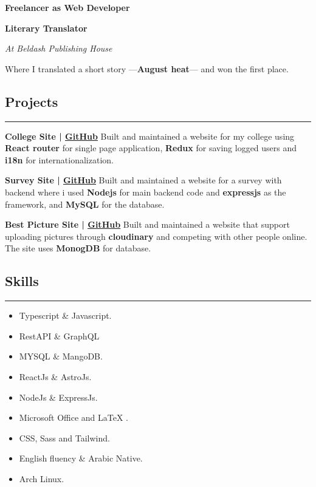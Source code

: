 \documentclass[12pt, a4paper]{article}
\begin{document}
   \textbf{Freelancer as Web Developer}\medbreak

    
   \textbf{Literary Translator}

   \textit{At Beldash Publishing House}\smallbreak

   Where I translated a short story —\textbf{August heat}— and won the first place.


\subsection*{Projects}
\vspace{-0.4em}
\hrule\bigbreak


\textbf{College Site | \underline{\href{https://english-section.netlify.app/}{GitHub}}}\smallbreak
Built and maintained a website for my college using \textbf{React router} for single page
application, \textbf{Redux} for saving logged users and 
\textbf{i18n} for internationalization.\bigbreak

\textbf{Survey Site | \underline{\href{https://sos-10-survey.netlify.app/}{GitHub}}}\smallbreak
Built and maintained a website for a survey with backend where i used \textbf{Nodejs} for
main backend code and \textbf{expressjs} as the framework, and \textbf{MySQL} for the 
database.\bigbreak

\textbf{Best Picture Site | \underline{\href{https://best-pic.netlify.app/}{GitHub}}}\smallbreak
Built and maintained a website that support uploading pictures through \textbf{cloudinary} and
competing with other people online. The site uses \textbf{MonogDB} for database.


\subsection*{Skills}
\vspace{-0.4em}
\hrule

\begin{multicols}{2} %
    \begin{itemize}[noitemsep,topsep=0pt]
        \item Typescript \& Javascript.
        \item RestAPI \& GraphQL 
        \item MYSQL \& MangoDB.
        \item ReactJs \& AstroJs.
        \item NodeJs \& ExpressJs.
        \item Microsoft Office and LaTeX .
        \item CSS, Sass and Tailwind.
        \item English fluency \& Arabic Native.
        \item Arch Linux.
    \end{itemize}
\end{multicols}
  
\end{document}

